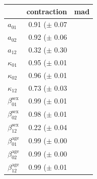 \begin{tabular}{lrr}
\toprule
 & contraction & mad \\
\midrule
$a_{01}$ & 0.91 ($\pm$ 0.07 \\
$a_{02}$ & 0.92 ($\pm$ 0.06 \\
$a_{12}$ & 0.32 ($\pm$ 0.30 \\
$\kappa_{01}$ & 0.95 ($\pm$ 0.01 \\
$\kappa_{02}$ & 0.96 ($\pm$ 0.01 \\
$\kappa_{12}$ & 0.73 ($\pm$ 0.03 \\
$\beta_{01}^\text{sex}$ & 0.99 ($\pm$ 0.01 \\
$\beta_{02}^\text{sex}$ & 0.98 ($\pm$ 0.01 \\
$\beta_{12}^\text{sex}$ & 0.22 ($\pm$ 0.04 \\
$\beta_{01}^\text{age}$ & 0.99 ($\pm$ 0.00 \\
$\beta_{02}^\text{age}$ & 0.99 ($\pm$ 0.00 \\
$\beta_{12}^\text{age}$ & 0.99 ($\pm$ 0.01 \\
\bottomrule
\end{tabular}
